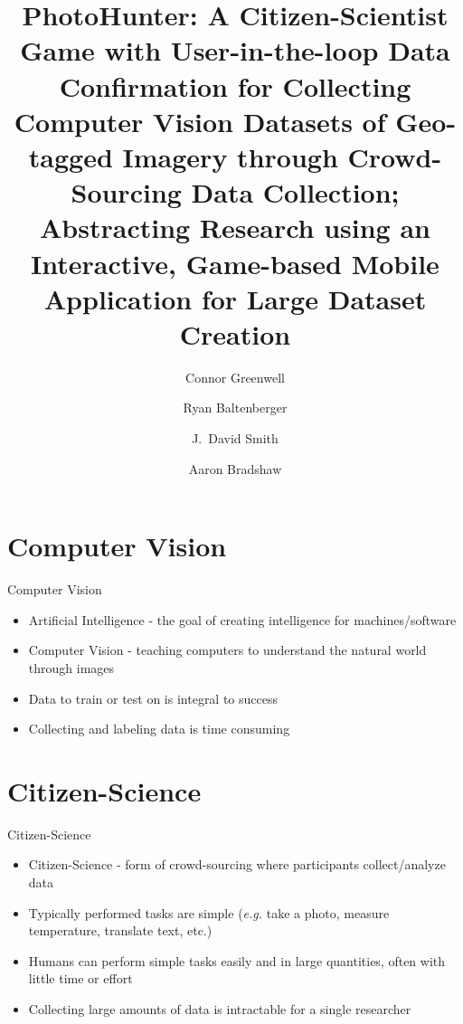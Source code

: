 \documentclass[aspectratio=169]{beamer}
\title[PhotoHunter]{PhotoHunter: A Citizen-Scientist Game with User-in-the-loop
  Data Confirmation for Collecting Computer Vision Datasets of
  Geo-tagged Imagery through Crowd-Sourcing Data Collection;
  Abstracting Research using an Interactive, Game-based Mobile
  Application for Large Dataset Creation}
\author[]{Connor Greenwell \and Ryan Baltenberger
  \and J.\ David Smith \and Aaron Bradshaw}
\institute{QuesoTech.com}
\begin{document}
\maketitle

\section{Computer Vision}

\begin{frame}{Computer Vision}
  \begin{itemize}

    \item Artificial Intelligence - the goal of creating intelligence for
          machines/software

    \item Computer Vision - teaching computers to understand the natural world
          through images

    \item Data to train or test on is integral to success

    \item Collecting and labeling data is time consuming

  \end{itemize}
\end{frame}

\section{Citizen-Science}

\begin{frame}{Citizen-Science}
  \begin{itemize}

    \item Citizen-Science - form of crowd-sourcing where participants
          collect/analyze data

    \item Typically performed tasks are simple (\textit{e.g.} take a photo,
          measure temperature, translate text, etc.)

    \item Humans can perform simple tasks easily and in large quantities,
          often with little time or effort

    \item Collecting large amounts of data is intractable for a single
          researcher

  \end{itemize}
\end{frame}
\end{document}
